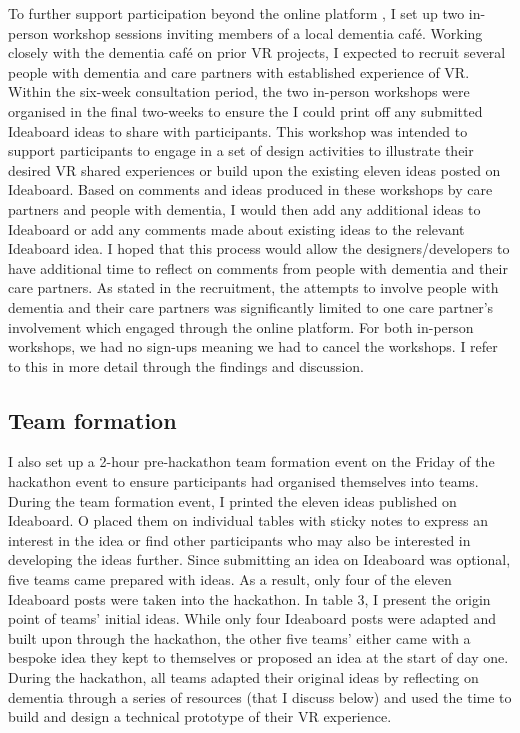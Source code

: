 To further support participation beyond the online platform \citep{piper2016technological}, I set up two in-person workshop sessions inviting members of a local dementia café. Working closely with the dementia café on prior VR projects, I expected to recruit several people with dementia and care partners with established experience of VR. Within the six-week consultation period, the two in-person workshops were organised in the final two-weeks to ensure the I could print off any submitted Ideaboard ideas to share with participants.  This workshop was intended to support participants to engage in a set of design activities to illustrate their desired VR shared experiences or build upon the existing eleven ideas posted on Ideaboard. Based on comments and ideas produced in these workshops by care partners and people with dementia, I would then add any additional ideas to Ideaboard or add any comments made about existing ideas to the relevant Ideaboard idea. I hoped that this process would allow the designers/developers to have additional time to reflect on comments from people with dementia and their care partners. As stated in the recruitment, the attempts to involve people with dementia and their care partners was significantly limited to one care partner’s involvement which engaged through the online platform. For both in-person workshops, we had no sign-ups meaning we had to cancel the workshops. I refer to this in more detail through the findings and discussion.

\subsection{Team formation}
\label{sec:TeamFormation}
I also set up a 2-hour pre-hackathon team formation event on the Friday of the hackathon event to ensure participants had organised themselves into teams. During the team formation event, I printed the eleven ideas published on Ideaboard. O placed them on individual tables with sticky notes to express an interest in the idea or find other participants who may also be interested in developing the ideas further. Since submitting an idea on Ideaboard was optional, five teams came prepared with ideas. As a result, only four of the eleven Ideaboard posts were taken into the hackathon. In table 3, I present the origin point of teams’ initial ideas. While only four Ideaboard posts were adapted and built upon through the hackathon, the other five teams’ either came with a bespoke idea they kept to themselves or proposed an idea at the start of day one. During the hackathon, all teams adapted their original ideas by reflecting on dementia through a series of resources (that I discuss below) and used the time to build and design a technical prototype of their VR experience. 

